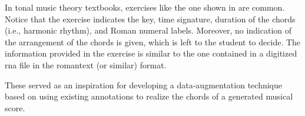 
In tonal music theory textbooks, exercises like the one
shown in  are common. Notice that
the exercise indicates the key, time signature, duration of
the chords (i.e., harmonic rhythm), and Roman numeral
labels. Moreover, no indication of the arrangement of the
chords is given, which is left to the student to decide. The
information provided in the exercise is similar to the one
contained in a digitized \gls{rna} file in the
\gls{romantext} (or similar) format. 


These served as an inspiration for developing a
data-augmentation technique based on using existing
annotations to \gls{realize} the chords of a generated
musical score.
